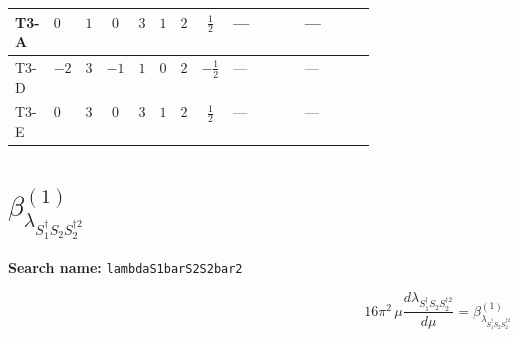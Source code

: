 \documentclass[8pt]{article}
\begin{document}
\begin{landscape}
\begin{longtable}{@{}llcccccc >{\raggedright\arraybackslash}p{0.21\linewidth} >{\raggedright\arraybackslash}p{0.21\linewidth}@{}}
\midrule
T3-A & $0$ & $1$ & $0$ & $3$ & $1$ & $2$ & $\frac{1}{2}$ & --- & --- \\
\midrule
T3-D & $-2$ & $3$ & $-1$ & $1$ & $0$ & $2$ & $-\frac{1}{2}$ & --- & --- \\
\midrule
T3-E & $0$ & $3$ & $0$ & $3$ & $1$ & $2$ & $\frac{1}{2}$ & --- & --- \\
\midrule
\bottomrule
\end{longtable}
\clearpage
\section*{$\beta_{\lambda_{S_1^\dagger S_2 S_2^{\dagger 2}}}^{(1)}$}
\noindent\textbf{Search name: }\texttt{lambdaS1barS2S2bar2}\par\smallskip
\[16\pi^2\,\mu\frac{d \lambda_{S_1^\dagger S_2 S_2^{\dagger 2}}}{d\mu}=\beta_{\lambda_{S_1^\dagger S_2 S_2^{\dagger 2}}}^{(1)}\]

\end{landscape}
\end{document}
